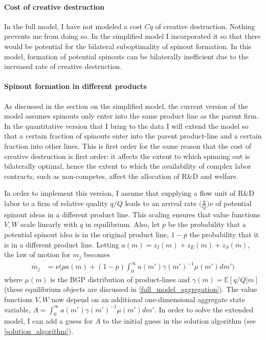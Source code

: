 \documentclass[11pt,english]{article}
\theoremstyle{remark}
\begin{document}
\paragraph{Cost of creative destruction}

In the full model, I have not modeled a cost $Cq$ of creative destruction. Nothing prevents me from doing so. In the simplified model I incorporated it so that there would be potential for the bilateral suboptimality of spinout formation. In this model, formation of potential spinouts can be bilaterally inefficient due to the increased rate of creative destruction.

\paragraph{Spinout formation in different products}

As discussed in the section on the simplified model, the current version of the model assumes spinouts only enter into the same product line as the parent firm. In the quantitative version that I bring to the data I will extend the model so that a certain fraction of spinouts enter into the parent product-line and a certain fraction into other lines. This is first order for the same reason that the cost of creative destruction is first order: it affects the extent to which spinning out is bilaterally optimal, hence the extent to which the availability of complex labor contracts, such as non-competes, affect the allocation of R\&D and welfare. 

In order to implement this version, I assume that supplying a flow unit of R\&D labor to a firm of relative quality $q/Q$ leads to an arrival rate $\Big(\frac{q}{Q}\Big) \nu$ of potential spinout ideas in a different product line. This scaling ensures that value functions $V,W$ scale linearly with $q$ in equilibrium. Also, let $p$ be the probability that a potential spinout idea is in the original product line, $1-p$ the probability that it is in a different product line. Letting $a(m) = z_I(m) + z_E(m) + z_S(m)$, the law of motion for $m_j$ becomes
\begin{align}
\dot{m_j} &= \nu \Big(p a(m) + (1-p) \int_0^{\infty} a(m') \gamma(m')^{-1} \mu(m') dm'  \Big)  \label{mj_law_of_motion_outOfIndustrySpinouts}
\end{align}
where $\mu(m)$ is the BGP distribution of product-lines and $\gamma(m) = \mathbb{E}[q/Q|m]$ (these equilibrium objects are discussed in \ref{full_model_aggregation}). The value functions $V,W$ now depend on an additional one-dimensional aggregate state variable, $A = \int_0^{\infty} a(m') \gamma(m')^{-1} \mu(m') dm'$. In order to solve the extended model, I can add a guess for $A$ to the initial guess in the solution algorithm (see \ref{solution_algorithm}). 
\end{document}
